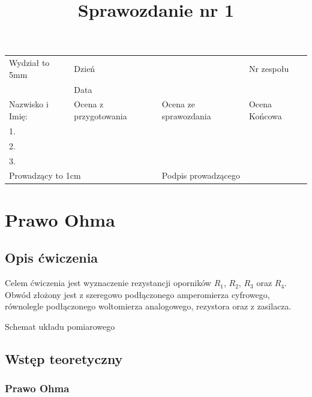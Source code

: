 \documentclass[a4paper]{article}
\title{Sprawozdanie nr 1}
\date{}
\newlength{\du}
\newcommand{\Vsp}[1]{\vtop to #1 {}}
\newcommand{\Small}{\scriptsize}
\begin{document}
\begin{center}
\begin{tabular}{|p{5cm}|l|l|l|}
    \hline
    Wydział \Vsp{5mm} & \multicolumn{1}{|l}{Dzień} &  & Nr zespołu\\
    & \multicolumn{1}{|l}{Data} &  & \\
    \hline 
    Nazwisko i Imię: & \Small Ocena z przygotowania  & \Small Ocena ze sprawozdania & \Small Ocena Końcowa \\
    1. & & &\\
    2. & & & \\
    3. & & & \\
    \hline
    \multicolumn{2}{|l|}{Prowadzący \Vsp{1cm}} & \multicolumn{2}{|l|}{Podpis prowadzącego} \\
    \hline
\end{tabular}
\end{center}

{\let\newpage\relax\maketitle}  %
\setcounter{secnumdepth}{2}
\setcounter{tocdepth}{2}

\section{Prawo Ohma}

\subsection{Opis ćwiczenia}

Celem ćwiczenia jest wyznaczenie rezystancji oporników $R_1$, $R_2$, $R_3$ oraz $R_4$.
Obwód złożony jest z szeregowo podłączonego amperomierza cyfrowego, równolegle podłączonego woltomierza analogowego, rezystora oraz z zasilacza.

\begin{table}[h]
\centering

\caption{Schemat układu pomiarowego}
\end{table}

\subsection{Wstęp teoretyczny}

\subsubsection{Prawo Ohma}
\end{document}
